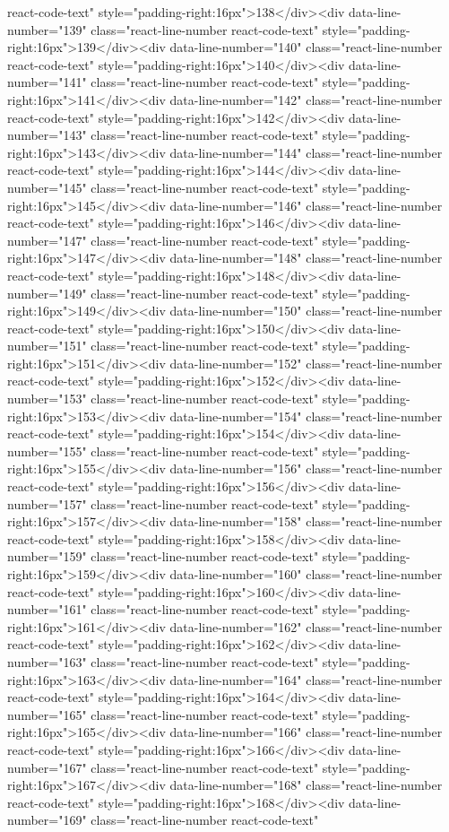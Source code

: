 {{{{{{{react-code-text" style="padding-right:16px">138</div><div data-line-number="139" class="react-line-number react-code-text" style="padding-right:16px">139</div><div data-line-number="140" class="react-line-number react-code-text" style="padding-right:16px">140</div><div data-line-number="141" class="react-line-number react-code-text" style="padding-right:16px">141</div><div data-line-number="142" class="react-line-number react-code-text" style="padding-right:16px">142</div><div data-line-number="143" class="react-line-number react-code-text" style="padding-right:16px">143</div><div data-line-number="144" class="react-line-number react-code-text" style="padding-right:16px">144</div><div data-line-number="145" class="react-line-number react-code-text" style="padding-right:16px">145</div><div data-line-number="146" class="react-line-number react-code-text" style="padding-right:16px">146</div><div data-line-number="147" class="react-line-number react-code-text" style="padding-right:16px">147</div><div data-line-number="148" class="react-line-number react-code-text" style="padding-right:16px">148</div><div data-line-number="149" class="react-line-number react-code-text" style="padding-right:16px">149</div><div data-line-number="150" class="react-line-number react-code-text" style="padding-right:16px">150</div><div data-line-number="151" class="react-line-number react-code-text" style="padding-right:16px">151</div><div data-line-number="152" class="react-line-number react-code-text" style="padding-right:16px">152</div><div data-line-number="153" class="react-line-number react-code-text" style="padding-right:16px">153</div><div data-line-number="154" class="react-line-number react-code-text" style="padding-right:16px">154</div><div data-line-number="155" class="react-line-number react-code-text" style="padding-right:16px">155</div><div data-line-number="156" class="react-line-number react-code-text" style="padding-right:16px">156</div><div data-line-number="157" class="react-line-number react-code-text" style="padding-right:16px">157</div><div data-line-number="158" class="react-line-number react-code-text" style="padding-right:16px">158</div><div data-line-number="159" class="react-line-number react-code-text" style="padding-right:16px">159</div><div data-line-number="160" class="react-line-number react-code-text" style="padding-right:16px">160</div><div data-line-number="161" class="react-line-number react-code-text" style="padding-right:16px">161</div><div data-line-number="162" class="react-line-number react-code-text" style="padding-right:16px">162</div><div data-line-number="163" class="react-line-number react-code-text" style="padding-right:16px">163</div><div data-line-number="164" class="react-line-number react-code-text" style="padding-right:16px">164</div><div data-line-number="165" class="react-line-number react-code-text" style="padding-right:16px">165</div><div data-line-number="166" class="react-line-number react-code-text" style="padding-right:16px">166</div><div data-line-number="167" class="react-line-number react-code-text" style="padding-right:16px">167</div><div data-line-number="168" class="react-line-number react-code-text" style="padding-right:16px">168</div><div data-line-number="169" class="react-line-number react-code-text" }}}}}}}
